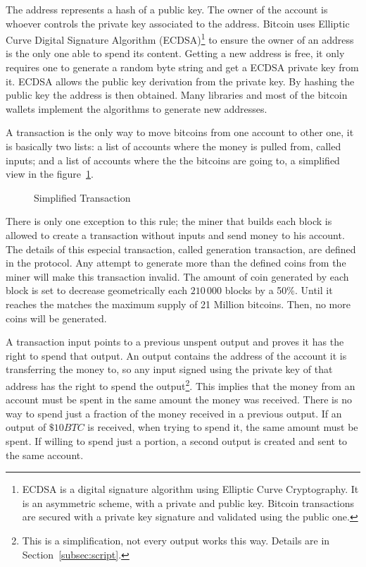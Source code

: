The address represents a hash of a public key. The owner of the account is
  whoever controls the private key associated to the address.
Bitcoin uses Elliptic Curve Digital Signature Algorithm (ECDSA)\footnote{%
  ECDSA is a digital signature algorithm using Elliptic Curve
    Cryptography. It is an asymmetric scheme, with a private and public key.
    Bitcoin transactions are secured with a private key signature and validated
    using the public one.} to ensure the owner of an address is the only one able
  to spend its content.
Getting a new address is free, it only requires one to generate a random byte
  string and get a ECDSA private key from it. ECDSA allows the public key
  derivation from the private key.
By hashing the public key the address is then obtained.
Many libraries and most of the bitcoin wallets implement the algorithms to
  generate new addresses.

A transaction is the only way to move bitcoins from one account to other one,
  it is basically two lists:
  a list of accounts where the money is pulled from, called inputs; and a list
  of accounts where the the bitcoins are going to, a simplified
  view in the figure~\ref{fig:simplified_transaction}.

\begin{figure}
	\centering
	
	\caption{Simplified Transaction}
	\label{fig:simplified_transaction}
\end{figure}

There is only one exception to this rule; the miner that builds each block is
  allowed to create a transaction without inputs and send money to his account.
The details of this especial transaction, called generation transaction, are
  defined in the protocol.
Any attempt to generate more than the defined coins from the miner will make
  this transaction invalid.
The amount of coin generated by each block is set to decrease geometrically
  each $210\,000$ blocks by a 50\%.
Until it reaches the matches the maximum supply of 21 Million bitcoins.
Then, no more coins will be generated.

A transaction input points to a previous unspent output and proves it has the
  right to spend that output.
An output contains the address of the account it is transferring the money to,
  so any input signed using the private key of that address has the right to
  spend the output\footnote{This is a simplification, not every output works
  this way. Details are in Section~\ref{subsec:script}.}.
This implies that the money from an account must be spent in the same amount
  the money was received. There is no way to spend just a fraction of the money
  received in a previous output. If an output of $\$ 10BTC$ is received, when
  trying to spend it, the same amount must be spent. If willing to spend just a
  portion, a second output is created and sent to the same account.

